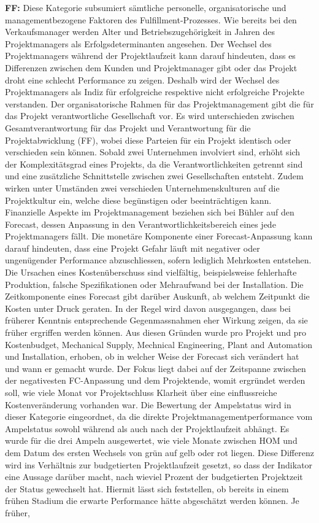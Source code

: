 \newline\newline\textbf{FF:} Diese Kategorie subsumiert sämtliche personelle, organisatorische und managementbezogene Faktoren des Fulfillment-Prozesses. Wie bereits bei den Verkaufsmanager werden Alter und Betriebszugehörigkeit in Jahren des Projektmanagers als Erfolgsdeterminanten angesehen. Der Wechsel des Projektmanagers während der Projektlaufzeit kann darauf hindeuten, dass es Differenzen zwischen dem Kunden und Projektmanager gibt oder das Projekt droht eine schlecht Performance zu zeigen. Deshalb wird der Wechsel des Projektmanagers als Indiz für erfolgreiche respektive nicht erfolgreiche Projekte verstanden. Der organisatorische Rahmen für das Projektmanagement gibt die für das Projekt verantwortliche Gesellschaft vor. Es wird unterschieden zwischen Gesamtverantwortung für das Projekt und Verantwortung für die Projektabwicklung (FF), wobei diese Parteien für ein Projekt identisch oder verschieden sein können. Sobald zwei Unternehmen involviert sind, erhöht sich der Komplexitätsgrad eines Projekts, da die Verantwortlichkeiten getrennt sind und eine zusätzliche Schnittstelle zwischen zwei Gesellschaften entsteht. Zudem wirken unter Umständen zwei verschieden Unternehmenskulturen auf die Projektkultur ein, welche diese begünstigen oder beeinträchtigen kann. Finanzielle Aspekte im Projektmanagement beziehen sich bei Bühler auf den Forecast, dessen Anpassung in den Verantwortlichkeitsbereich eines jede Projektmanagers fällt. Die monetäre Komponente einer Forecast-Anpassung kann darauf hindeuten, dass eine Projekt Gefahr läuft mit negativer oder ungenügender Performance abzuschliessen, sofern lediglich Mehrkosten entstehen. Die Ursachen eines Kostenüberschuss sind vielfältig, beispielsweise fehlerhafte Produktion, falsche Spezifikationen oder Mehraufwand bei der Installation. Die Zeitkomponente eines Forecast gibt darüber Auskunft, ab welchem Zeitpunkt die Kosten unter Druck geraten. In der Regel wird davon ausgegangen, dass bei früherer Kenntnis entsprechende Gegenmassnahmen eher Wirkung zeigen, da sie früher ergriffen werden können. Aus diesen Gründen wurde pro Projekt und pro Kostenbudget, Mechanical Supply, Mechnical Engineering, Plant and Automation und Installation, erhoben, ob in welcher Weise der Forecast sich verändert hat und wann er gemacht wurde. Der Fokus liegt dabei auf der Zeitspanne zwischen der negativesten FC-Anpassung und dem Projektende, womit ergründet werden soll, wie viele Monat vor Projektschluss Klarheit über eine einflussreiche Kostenveränderung vorhanden war. Die Bewertung der Ampelstatus wird in dieser Kategorie eingeordnet, da die direkte Projektmanagementperformance vom Ampelstatus sowohl während als auch nach der Projektlaufzeit abhängt. Es wurde für die drei Ampeln ausgewertet, wie viele Monate zwischen HOM und dem Datum des ersten Wechsels von grün auf gelb oder rot liegen. Diese Differenz wird ins Verhältnis zur budgetierten Projektlaufzeit gesetzt, so dass der Indikator eine Aussage darüber macht, nach wieviel Prozent der budgetierten Projektzeit der Status gewechselt hat. Hiermit lässt sich feststellen, ob bereits in einem frühen Stadium die erwarte Performance hätte abgeschätzt werden können. Je früher, 